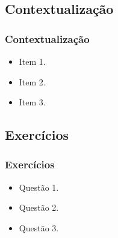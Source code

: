 \subsection[Contextualização]{Contextualização}\label{subsec:introducao-contextualizacao}



\begin{frame}[t]\frametitle{Contextualização}

  \begin{itemize}
    \justifying{}
    \setlength\itemsep{1em}
    \item Item 1.
    \item Item 2.
    \item Item 3.
  \end{itemize}

\end{frame}



\subsection[Exercícios]{Exercícios}\label{subsec:introducao-exercicios}



\begin{frame}[t]\frametitle{Exercícios}

  \begin{itemize}
    \justifying{}
    \setlength\itemsep{1em}
    \item Questão 1.
    \item Questão 2.
    \item Questão 3.
  \end{itemize}

\end{frame}
